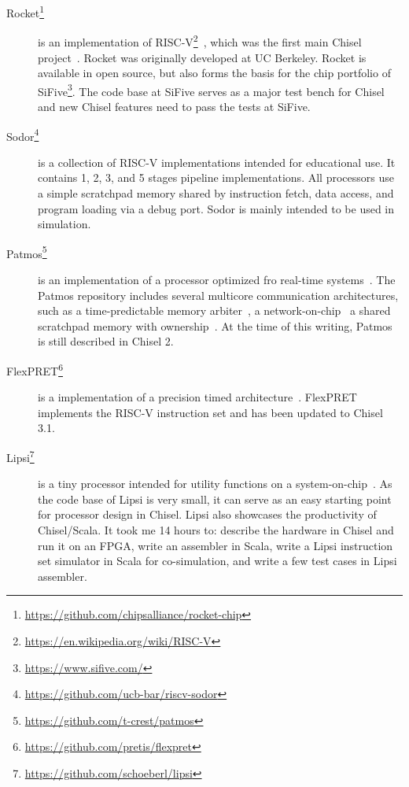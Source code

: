 \documentclass[%
    10pt,
    headinclude, footexclude,
    openright, %
    notitlepage,
    cleardoubleempty,
    headsepline,
    pointlessnumbers,
    bibtotoc, idxtotoc,
    ]{scrbook}
\newcommand{\myref}[2]{\href{#1}{#2}}
\renewcommand{\myref}[2]{{#2}{\footnote{\url{#1}}}}
\begin{document}
\begin{description}

\item[\myref{https://github.com/chipsalliance/rocket-chip}{Rocket}] is an implementation of \myref{https://en.wikipedia.org/wiki/RISC-V}{RISC-V}~\cite{risc-v}, which was
the first main Chisel project~\cite{rocket:techrep}. Rocket was originally developed at UC
Berkeley. Rocket is available in open source,
but also forms the basis for the chip portfolio of \myref{https://www.sifive.com/}{SiFive}.
The code base at SiFive serves as a major test bench for Chisel and new Chisel features
need to pass the tests at SiFive.

\item[\myref{https://github.com/ucb-bar/riscv-sodor}{Sodor}] is a collection of RISC-V
implementations intended for educational use. It contains 1, 2, 3, and 5 stages pipeline
implementations. All processors use a simple scratchpad memory shared by instruction
fetch, data access, and program loading via a debug port. Sodor is mainly intended to
be used in simulation.

\item[\myref{https://github.com/t-crest/patmos}{Patmos}] is an implementation of a
processor optimized fro real-time systems~\cite{patmos:rts2018}. The Patmos repository
includes several multicore communication architectures, such as a time-predictable memory
arbiter~\cite{t-crest:memnoc}, a network-on-chip~\cite{s4nocni:arcs2019}
a shared scratchpad memory with ownership~\cite{t-crest:ownspm}.
At the time of this writing, Patmos is still described in Chisel 2.

\item[\myref{https://github.com/pretis/flexpret}{FlexPRET}] is a implementation of a
precision timed architecture~\cite{Zimmer:EECS-2015-181}. FlexPRET implements
the RISC-V instruction set and has been updated to Chisel 3.1.

\item[\myref{https://github.com/schoeberl/lipsi}{Lipsi}] is a tiny processor intended
for utility functions on a system-on-chip~\cite{lipsi:arcs2018}. As the code base of
Lipsi is very small, it can serve as an easy starting point for processor design in Chisel.
Lipsi also showcases the productivity of Chisel/Scala. It took me 14 hours to: describe the
hardware in Chisel and run it on an FPGA, write an assembler in Scala, write a
Lipsi instruction set simulator in Scala for co-simulation, and write a few test cases
in Lipsi assembler.


\end{description}
\end{document}
